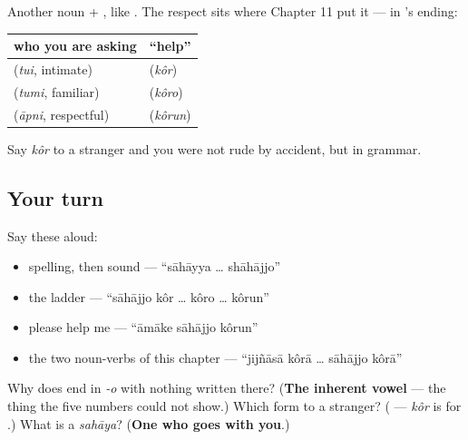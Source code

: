 \begin{grammarlens}[title={Grammar Lens: asking for help is where the respect ladder bites}]
Another noun + , like  . The respect sits where Chapter 11 put it — in ’s ending:

\noindent
\begin{tabularx}{\linewidth}{@{}>{\raggedright\arraybackslash}X>{\raggedright\arraybackslash}X@{}}
\toprule
\textbf{who you are asking} & \textbf{\textquotedblleft{}help\textquotedblright{}} \\
\midrule
\bn{তুই} (\emph{tui}, intimate) & \bn{সাহায্য} \bn{কর} (\emph{kôr}) \\
\bn{তুমি} (\emph{tumi}, familiar) & \bn{সাহায্য} \bn{করো} (\emph{kôro}) \\
\bn{আপনি} (\emph{āpni}, respectful) & \bn{সাহায্য} \bn{করুন} (\emph{kôrun}) \\
\bottomrule
\end{tabularx}

Say \emph{kôr} to a stranger and you were not rude by accident, but in grammar.
\end{grammarlens}

\subsection*{Your turn}
Say these aloud:

\begin{itemize}
\raggedright
  \item spelling, then sound — \textquotedblleft{}sāhāyya … shāhājjo\textquotedblright{}
  \item the ladder — \textquotedblleft{}sāhājjo kôr … kôro … kôrun\textquotedblright{}
  \item please help me — \textquotedblleft{}āmāke sāhājjo kôrun\textquotedblright{}
  \item the two noun-verbs of this chapter — \textquotedblleft{}jijñāsā kôrā … sāhājjo kôrā\textquotedblright{}
\end{itemize}

\begin{tcolorbox}[breakable,colback=teal!4,colframe=teal!35!black,title={Before you move on}]
Why does  end in \emph{-o} with nothing written there? (\textbf{The inherent vowel} — the thing the five numbers could not show.) Which form to a stranger? (\textbf{} — \emph{kôr} is for .) What is a \emph{sahāya}? (\textbf{One who goes with you}.)
\end{tcolorbox}
